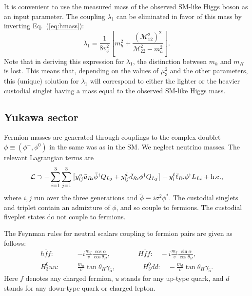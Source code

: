 \documentclass[11pt]{article}
\begin{document}
It is convenient to use the measured mass of the observed SM-like Higgs boson as an input parameter.  The coupling $\lambda_1$ can be eliminated in favor of this mass by inverting Eq.~(\ref{eq:hmass}):
\begin{equation}
	\lambda_1 = \frac{1}{8 v_{\phi}^2} \left[ m_h^2 
	+ \frac{\left( \mathcal{M}_{12}^2 \right)^2}{\mathcal{M}_{22}^2 - m_h^2} \right].
	\label{eq:lambda1}
\end{equation}
Note that in deriving this expression for $\lambda_1$, the distinction between $m_h$ and $m_H$ is lost.  This means that, depending on the values of $\mu_3^2$ and the other parameters, this (unique) solution for $\lambda_1$ will correspond to either the lighter or the heavier custodial singlet having a mass equal to the observed SM-like Higgs mass.

\subsection{Yukawa sector}

Fermion masses are generated through couplings to the complex doublet $\phi \equiv (\phi^+,\phi^0)$ in the same was as in the SM.  We neglect neutrino masses.  The relevant Lagrangian terms are
\begin{equation}
	\mathcal{L} \supset - \sum_{i=1}^3 \sum_{j=1}^3
	\left[ y^u_{ij} \bar u_{Ri} \tilde \phi^{\dagger} Q_{Lj}
	+ y^d_{ij} \bar d_{Ri} \phi^{\dagger} Q_{Lj} \right] 
	+ y^{\ell}_i \bar \ell_{Ri} \phi^{\dagger} L_{Li}
	+ {\rm h.c.},
\end{equation}
where $i,j$ run over the three generations and $\tilde \phi \equiv i \sigma^2 \phi^*$.  
The custodial singlets and triplet contain an admixture of $\phi$, and so couple to fermions.  The custodial fiveplet states do not couple to fermions.

The Feynman rules for neutral scalars coupling to fermion pairs are given as follows:
\begin{eqnarray}
	h \bar f f: &\quad& -i \frac{m_f}{v} \frac{\cos \alpha}{\cos \theta_H}, \qquad \qquad
	H \bar f f: \quad -i \frac{m_f}{v} \frac{\sin \alpha}{\cos \theta_H}, \nonumber \\
	H_3^0 \bar u u: &\quad& \frac{m_u}{v} \tan \theta_H \gamma_5, \qquad \qquad
	H_3^0 \bar d d: \quad -\frac{m_d}{v} \tan \theta_H \gamma_5.
\end{eqnarray}
Here $f$ denotes any charged fermion, $u$ stands for any up-type quark, and $d$ stands for any down-type quark or charged lepton.  
\end{document}
